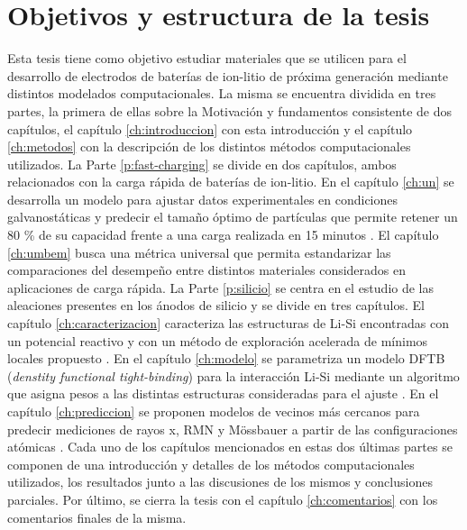 \section{Objetivos y estructura de la tesis}

Esta tesis tiene como objetivo estudiar materiales que se utilicen para el 
desarrollo de electrodos de baterías de ion-litio de próxima generación mediante 
distintos modelados computacionales. 
La misma se encuentra dividida en tres partes, la primera de ellas sobre la 
Motivación y fundamentos consistente de dos capítulos, el capítulo 
\ref{ch:introduccion} con esta introducción y el capítulo \ref{ch:metodos} con la
descripción de los distintos métodos computacionales utilizados. 
La Parte \ref{p:fast-charging} se divide en dos capítulos, ambos relacionados con 
la carga rápida de baterías de ion-litio. En el capítulo \ref{ch:un} se 
desarrolla un modelo para ajustar datos experimentales en condiciones 
galvanostáticas y predecir el tamaño óptimo de partículas que permite retener un 
80 \% de su capacidad frente a una carga realizada en 15 minutos 
\cite{fernandez2023towards}. El capítulo \ref{ch:umbem} busca una métrica 
universal que permita estandarizar las comparaciones del desempeño entre 
distintos materiales considerados en aplicaciones de carga rápida.
La Parte \ref{p:silicio} se centra en el estudio de las aleaciones presentes en 
los ánodos de silicio y se divide en tres capítulos. El capítulo 
\ref{ch:caracterizacion} caracteriza las estructuras de Li-Si encontradas con 
un potencial reactivo y con un método de exploración acelerada de mínimos locales
propuesto \cite{fernandez2021characterization}. En el capítulo \ref{ch:modelo} se
parametriza un modelo DFTB (\textit{denstity functional tight-binding}) para la 
interacción Li-Si mediante un algoritmo que asigna pesos a las distintas 
estructuras consideradas para el ajuste \cite{oviedo2023}. En el capítulo 
\ref{ch:prediccion} se proponen modelos de vecinos más cercanos para predecir 
mediciones de rayos x, RMN y Mössbauer a partir de las configuraciones atómicas
\cite{fernandez2023nmr}.
Cada uno de los capítulos mencionados en estas dos últimas partes se componen
de una introducción y detalles de los métodos computacionales utilizados, los 
resultados junto a las discusiones de los mismos y conclusiones parciales.
Por último, se cierra la tesis con el capítulo \ref{ch:comentarios} con los 
comentarios finales de la misma.
